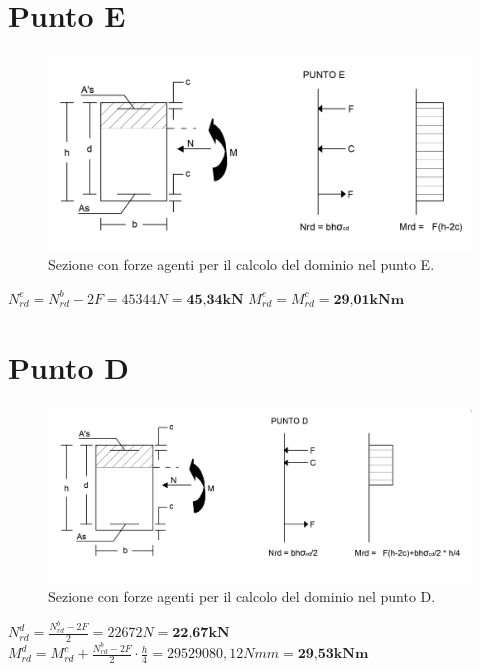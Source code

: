 \documentclass[a4paper,12pt, oneside]{book}
\begin{document}
    \section{Punto E}
    \begin{figure}[H]
    	\centering
    	\includegraphics[width=0.82\linewidth]{"immagini/dominio E"}
    	\caption{Sezione con forze agenti per il calcolo del dominio nel punto E.}
    	\label{fig:dominio-e}
    \end{figure}
    
    $N_{rd}^{e}=N_{rd}^{b}-2F=45344N=\textbf{45,34kN}$
    \leavevmode\newline
    \leavevmode\newline
    $M_{rd}^{e}=M_{rd}^{c}=\textbf{29,01kNm}$
    
    \section{Punto D}
    \begin{figure}[H]
    	\hspace*{1.1cm}
    	\centering
    	\includegraphics[width=0.92\linewidth]{"immagini/dominio D"}
    	\caption{Sezione con forze agenti per il calcolo del dominio nel punto D.}
    	\label{fig:dominio-d}
    \end{figure}
    
    $N_{rd}^{d}=\frac{N_{rd}^{b}-2F}{2}=22672N=\textbf{22,67kN}$
    \leavevmode\newline
    \leavevmode\newline
    $M_{rd}^{d}=M_{rd}^{c}+\frac{N_{rd}^{b}-2F}{2}\cdot \frac{h}{4}=29529080,12Nmm=\textbf{29,53kNm}$
    
\end{document}

